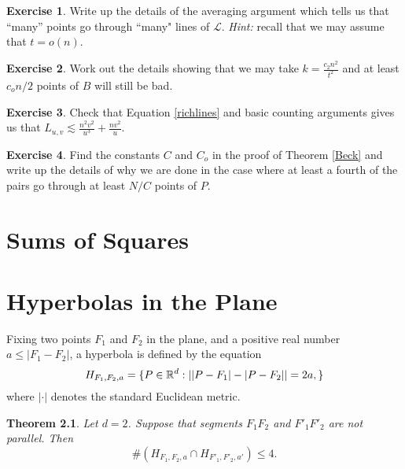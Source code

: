\documentclass[]{stml-l}
\numberwithin{equation}{chapter}
\theoremstyle{plain}
\newtheorem{theorem}[equation]{Theorem}
\theoremstyle{definition}
\newtheorem{exercise}{Exercise}[chapter]
\theoremstyle{remark}
\begin{document}
\begin{exercise} \label{ex5.1}
Write up the details of the averaging argument which tells us that
``many'' points go through ``many" lines of $\mathcal{L}$.  {\it Hint:}
recall that we may assume that $t = o(n)$. \end{exercise}

\begin{exercise} \label{ex5.2}
Work out the details showing that we may take $k=
\frac{c_2n^2}{t^2}$ and at least $c_on/2$ points of $B$ will still
be bad.\end{exercise}

\begin{exercise} \label{ex5.3}
Check that Equation \ref{richlines} and basic counting arguments
gives us that $L_{u,v} \lesssim \frac{n^2v^2}{u^3} +
\frac{nv^2}{u}$.\end{exercise}


\begin{exercise} \label{ex5.4}
Find the constants $C$ and $C_o$ in the proof of Theorem
\ref{Beck} and write up the details of why we are done in the case
where at least a fourth of the pairs go through at least $N/C$
points of $P$. \end{exercise}


\appendix

\chapter{Sums of Squares} \label{sum.append}



\chapter{Hyperbolas in the Plane} \label{hyper.append}

Fixing two points $F_1$ and $F_2$ in the plane, and a positive real number $a \leq |F_1-F_2|$, a hyperbola is defined by the equation
\begin{equation} \label{defhyper} H_{F_1,F_2,a}=\{P \in {\Bbb R}^d: | |P-F_1|-|P-F_2|| = 2a, \} \end{equation} where $|\cdot|$ denotes the standard Euclidean metric. 

\begin{theorem} Let $d=2$. Suppose that segments $F_1F_2$ and $F'_1F'_2$ are not parallel. Then 
$$ \# (H_{F_1,F_2,a} \cap H_{F'_1,F'_2,a'}) \leq 4. $$ \end{theorem} 
\end{document}
